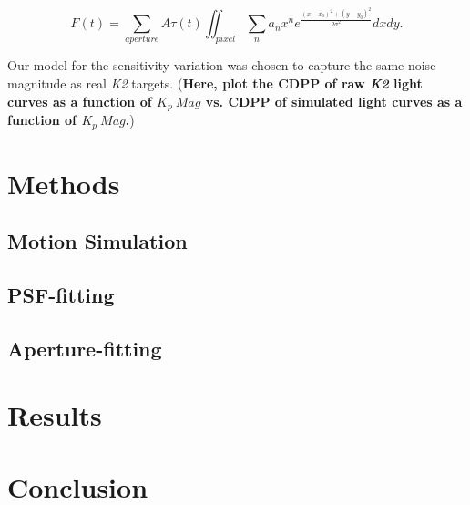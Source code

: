 \documentclass[12pt,preprint]{aastex}
\begin{document}
\[
F(t) = \sum_{aperture} A\tau(t) \iint_{pixel} \sum_n a_n x^n e^{\frac{\left(x-x_0 \right)^2+\left( y-y_0 \right)^2}{2\sigma^2}} dxdy.
\]

Our model for the sensitivity variation was chosen to capture the same noise magnitude as real \textit{K2} targets. (\textbf{Here, plot the CDPP of raw \textit{K2} light curves as a function of $K_p\ Mag$ vs. CDPP of simulated light curves as a function of $K_p\ Mag$.})

\section{Methods}

\subsection{Motion Simulation}

\subsection{PSF-fitting}

\subsection{Aperture-fitting}

\section{Results}

\section{Conclusion}

\clearpage


\end{document}

